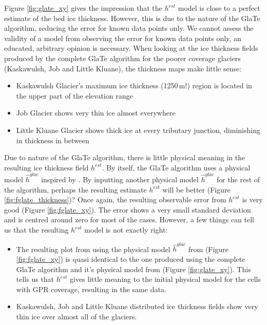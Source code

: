 \documentclass[a4, 12pt]{article}
\begin{document}
Figure \ref{fig:glate_xy} gives the impression that the $h^{est}$ model is close to a perfect estimate of the bed ice thickness. However, this is due to the nature of the GlaTe algorithm, reducing the error for known data points only. We cannot assess the validity of a model from observing the error for known data points only, an educated, arbitrary opinion is necessary. When looking at the ice thickness fields produced by the complete GlaTe algorithm for the poorer coverage glaciers (Kaskawulsh, Job and Little Kluane), the thickness maps make little sense:
\begin{itemize}
\item Kaskawulsh Glacier's maximum ice thickness (1250\,m!) region is located in the upper part of the elevation range
\item Job Glacier shows very thin ice almost everywhere
\item Little Kluane Glacier shows thick ice at every tributary junction, diminishing in thickness in between
\end{itemize}

Due to nature of the GlaTe algorithm, there is little physical meaning in the resulting ice thickness field $h^{est}$. By itself, the GlaTe algorithm uses a physical model $\hat{h}^{glac}$ inspired by \citet{clarke2013ice}. By inputting another physical model $\hat{h}^{glac}$ for the rest of the algorithm, perhaps the resulting estimate $h^{est}$ will be better (Figure \ref{fig:fglate_thickness})? Once again, the resulting observable error from $h^{est}$ is very good (Figure \ref{fig:fglate_xy}). The error shows a very small standard deviation and is centred around zero for most of the cases. However, a few things can tell us that the resulting $h^{est}$ model is not exactly right:
\begin{itemize}
\item The resulting plot from using the physical model $\hat{h}^{glac}$ from \citet{farinotti2019consensus} (Figure \ref{fig:fglate_xy}) is quasi identical to the one produced using the complete GlaTe algorithm and it's physical model from \citet{clarke2013ice} (Figure \ref{fig:glate_xy}). This tells us that $h^{est}$ gives little meaning to the initial physical model for the cells with GPR coverage, resulting in the same data.
\item Kaskawulsh, Job and Little Kluane distributed ice thickness fields show very thin ice over almost all of the glaciers.
\end{itemize}
\end{document}
